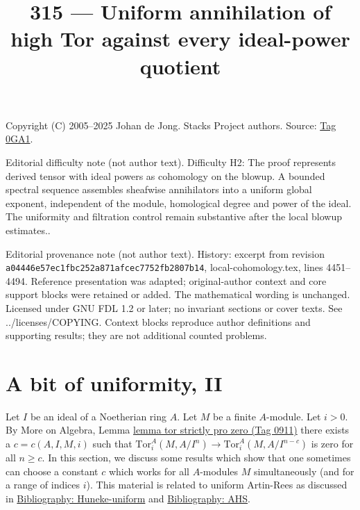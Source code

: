 \documentclass{amsart}
\theoremstyle{plain}
\theoremstyle{definition}
\theoremstyle{remark}
\numberwithin{equation}{subsection}
\begin{document}
\title[Stacks Project, Tag 0GA1]{315 --- Uniform annihilation of high Tor against every ideal-power quotient}
\maketitle
\noindent Copyright (C) 2005--2025 Johan de Jong. Stacks Project authors. Source: \href{https://stacks.math.columbia.edu/tag/0GA1}{Tag 0GA1}.

\noindent Editorial difficulty note (not author text). Difficulty H2: The proof represents derived tensor with ideal powers as cohomology on the blowup. A bounded spectral sequence assembles sheafwise annihilators into a uniform global exponent, independent of the module, homological degree and power of the ideal. The uniformity and filtration control remain substantive after the local blowup estimates..

\noindent Editorial provenance note (not author text). History: excerpt from revision \texttt{a0444\allowbreak 6e57e\allowbreak c1fbc\allowbreak 252a8\allowbreak 71afc\allowbreak ec775\allowbreak 2fb28\allowbreak 07b14}, local-cohomology.tex, lines 4451--4494. Reference presentation was adapted; original-author context and core support blocks were retained or added. The mathematical wording is unchanged. Licensed under GNU FDL 1.2 or later; no invariant sections or cover texts. See ../licenses/COPYING. Context blocks reproduce author definitions and supporting results; they are not additional counted problems.

\section{A bit of uniformity, II}
\label{section-uniform-vanishing-bis}

\noindent
Let $I$ be an ideal of a Noetherian ring $A$. Let $M$ be a finite
$A$-module. Let $i > 0$. By More on Algebra, Lemma
\href{https://stacks.math.columbia.edu/tag/0911}{lemma tor strictly pro zero (Tag 0911)}
there exists a $c = c(A, I, M, i)$ such that
$\text{Tor}^A_i(M, A/I^n) \to \text{Tor}^A_i(M, A/I^{n - c})$
is zero for all $n \geq c$. In this section, we discuss
some results which show that one sometimes can choose
a constant $c$ which works for all $A$-modules $M$ simultaneously
(and for a range of indices $i$).
This material is related to uniform Artin-Rees as discussed in
\href{https://stacks.math.columbia.edu/bibliography}{Bibliography: Huneke-uniform} and \href{https://stacks.math.columbia.edu/bibliography}{Bibliography: AHS}.
\end{document}

